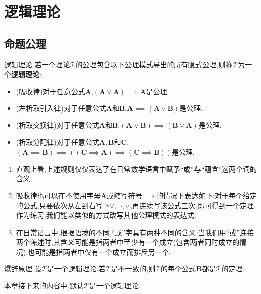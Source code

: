 \chapter{逻辑理论}

\section{命题公理}

\begin{definition}{逻辑理论}{}
	若一个理论$\mathcal{T}$的公理包含以下公理模式导出的所有隐式公理,则称$\mathcal{T}$为一个\textbf{逻辑理论}:
	\begin{itemize}
		\item (吸收律)对于任意公式$\boldsymbol{A}$,$\left(\boldsymbol{A}\vee\boldsymbol{A}\right)\implies\boldsymbol{A}$是公理.
		\item (左析取引入律)对于任意公式$\boldsymbol{A}$和$\boldsymbol{B}$,$\boldsymbol{A}\implies\left(\boldsymbol{A}\vee\boldsymbol{B}\right)$是公理.
		\item (析取交换律)对于任意公式$\boldsymbol{A}$和$\boldsymbol{B}$,$\left(\boldsymbol{A}\vee\boldsymbol{B}\right)\implies\left(\boldsymbol{B}\vee\boldsymbol{A}\right)$是公理.
		\item (析取分配律)对于任意公式$\boldsymbol{A},\boldsymbol{B}$和$\boldsymbol{C}$,$\left(\boldsymbol{A}\implies\boldsymbol{B}\right)\implies\left(\left(\boldsymbol{C}\implies\boldsymbol{A}\right)\implies\left(\boldsymbol{C}\implies\boldsymbol{B}\right)\right)$是公理.
	\end{itemize}
\end{definition}

\begin{remark}{}{}
	\begin{enumerate}
		\item 直观上看,上述规则仅仅表达了在日常数学语言中赋予``或''与``蕴含''这两个词的含义.
		\item 吸收律也可以在不使用字母$\boldsymbol{A}$或缩写符号$\implies$的情况下表达如下:对于每个给定的公式,只要依次从左到右写下$\vee,\neg,\vee$,再连续写该公式三次,即可得到一个定理.作为练习,我们能以类似的方式改写其他公理模式的表达式.
		\item 在日常语言中,根据语境的不同,``或''字具有两种不同的含义:当我们用``或''连接两个陈述时,其含义可能是指两者中至少有一个成立(包含两者同时成立的情况),也可能是指两者中仅有一个成立而排斥另一个.
	\end{enumerate}
\end{remark}

\begin{theorem}{爆辞原理}{}
	设$\mathcal{T}$是一个逻辑理论.若$\mathcal{T}$是不一致的,则$\mathcal{T}$的每个公式$\boldsymbol{B}$都是$\mathcal{T}$的定理.
\end{theorem}

本章接下来的内容中,默认$\mathcal{T}$是一个逻辑理论.